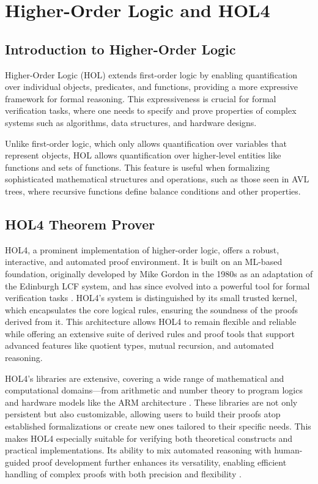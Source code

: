 \documentclass[12pt]{article}
\begin{document}
\section{Higher-Order Logic and HOL4}
\subsection{Introduction to Higher-Order Logic}

Higher-Order Logic (HOL) extends first-order logic by enabling quantification over individual objects, predicates, and functions, providing a more expressive framework for formal reasoning. This expressiveness is crucial for formal verification tasks, where one needs to specify and prove properties of complex systems such as algorithms, data structures, and hardware designs.

Unlike first-order logic, which only allows quantification over variables that represent objects, HOL allows quantification over higher-level entities like functions and sets of functions. This feature is useful when formalizing sophisticated mathematical structures and operations, such as those seen in AVL trees, where recursive functions define balance conditions and other properties.

\subsection{HOL4 Theorem Prover}

HOL4, a prominent implementation of higher-order logic, offers a robust, interactive, and automated proof environment. It is built on an ML-based foundation, originally developed by Mike Gordon in the 1980s as an adaptation of the Edinburgh LCF system, and has since evolved into a powerful tool for formal verification tasks \cite{gordon1993introduction}. HOL4’s system is distinguished by its small trusted kernel, which encapsulates the core logical rules, ensuring the soundness of the proofs derived from it. This architecture allows HOL4 to remain flexible and reliable while offering an extensive suite of derived rules and proof tools that support advanced features like quotient types, mutual recursion, and automated reasoning.

HOL4’s libraries are extensive, covering a wide range of mathematical and computational domains—from arithmetic and number theory to program logics and hardware models like the ARM architecture \cite{harrison2009handbook}. These libraries are not only persistent but also customizable, allowing users to build their proofs atop established formalizations or create new ones tailored to their specific needs. This makes HOL4 especially suitable for verifying both theoretical constructs and practical implementations. Its ability to mix automated reasoning with human-guided proof development further enhances its versatility, enabling efficient handling of complex proofs with both precision and flexibility \cite{nipkow2002isabelle}.
\end{document}
